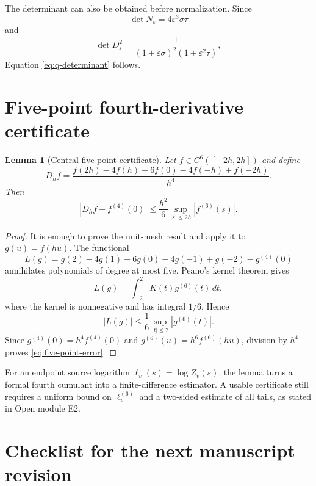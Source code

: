 \documentclass[11pt]{article}
\newtheorem{lemma}[theorem]{Lemma}
\newcommand{\eps}{\varepsilon}
\begin{document}
The determinant can also be obtained before normalization.  Since
\[
  \det N_\eps=4\eps^3\sigma\tau
\]
and
\[
  \det D_\eps^2
  =\frac{1}{(1+\eps\sigma)^2(1+\eps^2\tau)},
\]
Equation \eqref{eq:q-determinant} follows.

\section{Five-point fourth-derivative certificate}
\label{app:five-point}

\begin{lemma}[Central five-point certificate]
Let $f\in C^6([-2h,2h])$ and define
\begin{equation}
  D_hf
  =\frac{f(2h)-4f(h)+6f(0)-4f(-h)+f(-2h)}{h^4}.
  \label{eq:five-point}
\end{equation}
Then
\begin{equation}
  \left|D_hf-f^{(4)}(0)\right|
  \le\frac{h^2}{6}
  \sup_{|s|\le2h}|f^{(6)}(s)|.
  \label{eq:five-point-error}
\end{equation}
\end{lemma}

\begin{proof}
It is enough to prove the unit-mesh result and apply it to $g(u)=f(hu)$.  The functional
\[
  L(g)=g(2)-4g(1)+6g(0)-4g(-1)+g(-2)-g^{(4)}(0)
\]
annihilates polynomials of degree at most five.  Peano's kernel theorem gives
\[
  L(g)=\int_{-2}^{2}K(t)g^{(6)}(t)\,dt,
\]
where the kernel is nonnegative and has integral $1/6$.  Hence
\[
  |L(g)|\le\frac16\sup_{|t|\le2}|g^{(6)}(t)|.
\]
Since $g^{(4)}(0)=h^4f^{(4)}(0)$ and $g^{(6)}(u)=h^6f^{(6)}(hu)$, division by $h^4$ proves \eqref{eq:five-point-error}.
\end{proof}

For an endpoint source logarithm $\ell_v(s)=\log Z_v(s)$, the lemma turns a formal fourth cumulant into a finite-difference estimator.  A usable certificate still requires a uniform bound on $\ell_v^{(6)}$ and a two-sided estimate of all tails, as stated in Open module E2.

\section{Checklist for the next manuscript revision}
\label{app:checklist}
\end{document}
